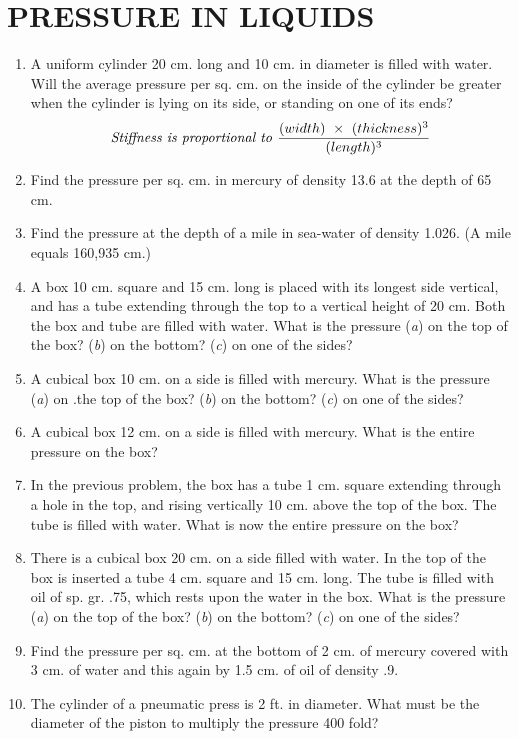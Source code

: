 \documentclass[11pt]{article}
\begin{document}
\section*{PRESSURE IN LIQUIDS}
	\begin{enumerate}
\item A uniform cylinder 20 cm. long and 10 cm. in diameter is filled with water. Will the average pressure per sq. cm. on the inside of the cylinder be greater when the cylinder is lying on its side, or standing on one of its ends?
$$\mbox{\emph{Stiffness is proportional to }} \frac{(width)\ \times\ (thickness)^3}{(length)^3}$$
\item Find the pressure per sq. cm. in mercury of density 13.6 at the depth of 65 cm.
\item Find the pressure at the depth of a mile in sea-water of density 1.026. (A mile equals 160,935 cm.)
\item A box 10 cm. square and 15 cm. long is placed with its longest side vertical, and has a tube extending through the top to a vertical height of 20 cm. Both the box and tube are filled with water. What is the pressure (\emph{a}) on the top of the box? (\emph{b}) on the bottom? (\emph{c}) on one of the sides? 
\item A cubical box 10 cm. on a side is filled with mercury. What is the pressure (\emph{a}) on .the top of the box? (\emph{b}) on the bottom? (\emph{c}) on one of the sides?
\item A cubical box 12 cm. on a side is filled with mercury. What is the entire pressure on the box?
\item In the previous problem, the box has a tube 1 cm. square extending through a hole in the top, and rising vertically 10 cm. above the top of the box. The tube is filled with water. What is now the entire pressure on the box?
\item There is a cubical box 20 cm. on a side filled with water. In the top of the box is inserted a tube 4 cm. square and 15 cm. long. The tube is filled with oil of sp. gr. .75, which rests upon the water in the box. What is the pressure (\emph{a}) on the top of the box? (\emph{b}) on the bottom? (\emph{c}) on one of the sides?
\item Find the pressure per sq. cm. at the bottom of 2 cm. of mercury covered with 3 cm. of water and this again by 1.5 cm. of oil of density .9.
\item The cylinder of a pneumatic press is 2 ft. in diameter. What must be the diameter of the piston to multiply the pressure 400 fold?

\end{enumerate}
\end{document}
